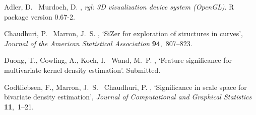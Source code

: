 \documentclass[a4paper]{article}
\begin{document}

%

\begin{thebibliography}{xx}

Adler, D. \harvardand\ Murdoch, D.  \harvardright , {\em rgl:
  3D visualization device system (OpenGL)}.
\newblock R package version 0.67-2.

Chaudhuri, P. \harvardand\ Marron, J.~S.  \harvardright ,
  `Si{Z}er for exploration of structures in curves', {\em Journal of the
  American Statistical Association} {\bf 94},~807--823.

Duong, T., Cowling, A., Koch, I. \harvardand\ Wand, M.~P.  \harvardleft
  2006\harvardright , `Feature significance for multivariate kernel density
  estimation'.
\newblock Submitted.

Godtliebsen, F., Marron, J.~S. \harvardand\ Chaudhuri, P.  \harvardleft
  2002\harvardright , `Significance in scale space for bivariate density
  estimation', {\em Journal of Computational and Graphical Statistics} {\bf
  11},~1--21.

\end{thebibliography}
 
\end{document}
